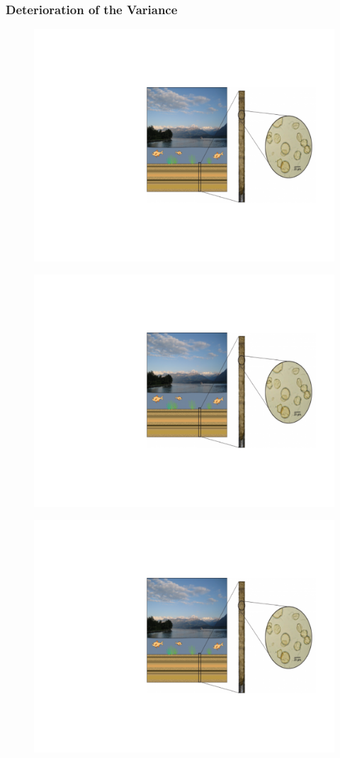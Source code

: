 \documentclass{beamer}
\begin{document}
\begin{frame}
\frametitle{Deterioration of the Variance}

{\begin{figure}
\includegraphics[width=.65\linewidth]{cores.pdf}
\end{figure}}

{\begin{figure}
\includegraphics[width=.65\linewidth]{cores.pdf}
\end{figure}}

{\begin{figure}
\includegraphics[width=.65\linewidth]{cores.pdf}
\end{figure}}
\end{frame}
\end{document}
